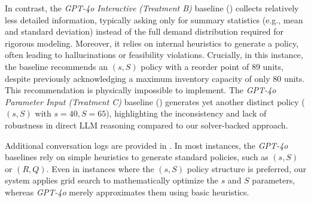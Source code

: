 In contrast, the \textit{GPT-4o Interactive (Treatment B)} baseline () collects relatively less detailed information, typically asking only for summary statistics (e.g., mean and standard deviation) instead of the full demand distribution required for rigorous modeling. Moreover, it relies on internal heuristics to generate a policy, often leading to hallucinations or feasibility violations. Crucially, in this instance, the baseline recommends an $(s, S)$ policy with a reorder point of 89 units, despite previously acknowledging a maximum inventory capacity of only 80 units. This recommendation is physically impossible to implement. The \textit{GPT-4o Parameter Input (Treatment C)} baseline () generates yet another distinct policy ($(s, S)$ with $s=40, S=65$), highlighting the inconsistency and lack of robustness in direct LLM reasoning compared to our solver-backed approach.


Additional conversation logs are provided in . In most instances, the \textit{GPT-4o} baselines rely on simple heuristics to generate standard policies, such as $(s, S)$ or $(R, Q)$. Even in instances where the $(s, S)$ policy structure is preferred, our system applies grid search to mathematically optimize the $s$ and $S$ parameters, whereas \emph{GPT-4o} merely approximates them using basic heuristics.













